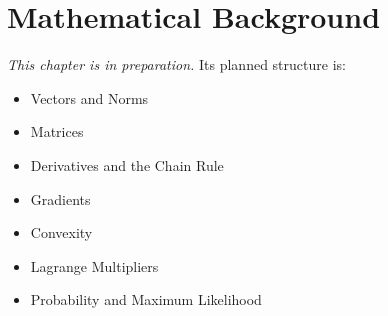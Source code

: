 
\chapter{Mathematical Background}
\label{ch:appA}

\noindent\textit{This chapter is in preparation.} Its planned structure is:

\begin{itemize}
  \item Vectors and Norms
  \item Matrices
  \item Derivatives and the Chain Rule
  \item Gradients
  \item Convexity
  \item Lagrange Multipliers
  \item Probability and Maximum Likelihood
\end{itemize}
